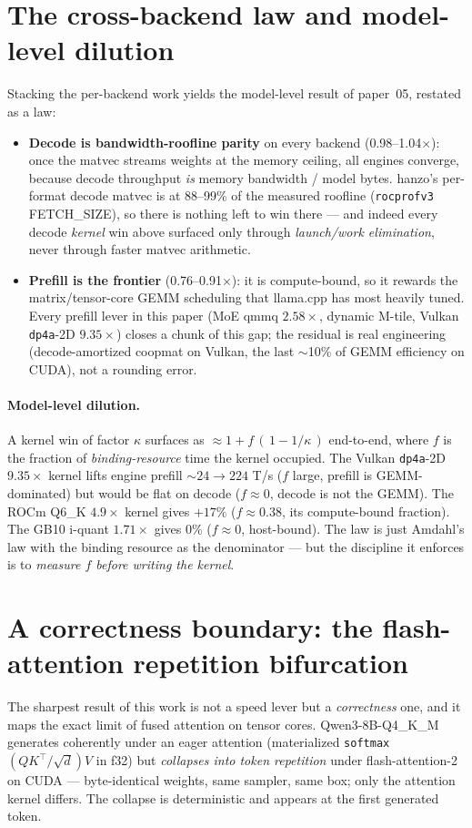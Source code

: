 \documentclass[11pt]{article}
\newcommand{\x}{\ensuremath{\times}}
\newcommand{\dpa}{\texttt{dp4a}}
\begin{document}
\section{The cross-backend law and model-level dilution}
\label{sec:law}
Stacking the per-backend work yields the model-level result of paper~05, restated as a law:
\begin{itemize}[noitemsep]
  \item \textbf{Decode is bandwidth-roofline parity} on every backend (0.98--1.04\x): once the
        matvec streams weights at the memory ceiling, all engines converge, because decode
        throughput \emph{is} memory bandwidth / model bytes. hanzo's per-format decode matvec is at
        88--99\% of the measured roofline (\texttt{rocprofv3} FETCH\_SIZE), so there is nothing left
        to win there --- and indeed every decode \emph{kernel} win above surfaced only through
        \emph{launch/work elimination}, never through faster matvec arithmetic.
  \item \textbf{Prefill is the frontier} (0.76--0.91\x): it is compute-bound, so it rewards the
        matrix/tensor-core GEMM scheduling that llama.cpp has most heavily tuned. Every prefill
        lever in this paper (MoE qmmq $2.58\x$, dynamic M-tile, Vulkan \dpa{}-2D $9.35\x$) closes a
        chunk of this gap; the residual is real engineering (decode-amortized coopmat on Vulkan,
        the last $\sim$10\% of GEMM efficiency on CUDA), not a rounding error.
\end{itemize}

\paragraph{Model-level dilution.} A kernel win of factor $\kappa$ surfaces as
$\approx 1 + f\,(\,1 - 1/\kappa\,)$ end-to-end, where $f$ is the fraction of \emph{binding-resource}
time the kernel occupied. The Vulkan \dpa{}-2D $9.35\x$ kernel lifts engine prefill $\sim 24\to224$
T/s ($f$ large, prefill is GEMM-dominated) but would be flat on decode ($f\approx 0$, decode is not
the GEMM). The ROCm Q6\_K $4.9\x$ kernel gives $+17\%$ ($f\approx 0.38$, its compute-bound
fraction). The GB10 i-quant $1.71\x$ gives $0\%$ ($f\approx 0$, host-bound). The law is just
Amdahl's law with the binding resource as the denominator --- but the discipline it enforces is to
\emph{measure $f$ before writing the kernel}.

\section{A correctness boundary: the flash-attention repetition bifurcation}
\label{sec:flash-bifurcation}
The sharpest result of this work is not a speed lever but a \emph{correctness} one, and it maps the
exact limit of fused attention on tensor cores. Qwen3-8B-Q4\_K\_M generates coherently under an
eager attention (materialized \texttt{softmax}$(QK^\top/\sqrt d)V$ in f32) but \emph{collapses into
token repetition} under flash-attention-2 on CUDA --- byte-identical weights, same sampler, same
box; only the attention kernel differs. The collapse is deterministic and appears at the first
generated token.
\end{document}

